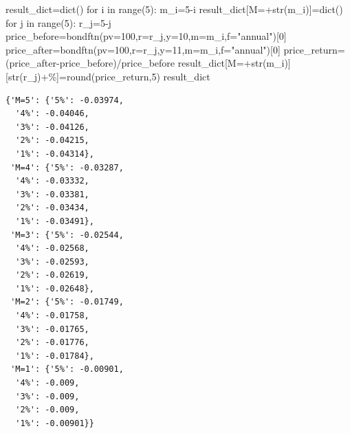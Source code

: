 \documentclass[
  a4paper,
  DIV=11,
  numbers=noendperiod]{scrreprt}
\newenvironment{Shaded}{\begin{snugshade}}{\end{snugshade}}
\newcommand{\BuiltInTok}[1]{\textcolor[rgb]{0.00,0.23,0.31}{#1}}
\newcommand{\ControlFlowTok}[1]{\textcolor[rgb]{0.00,0.23,0.31}{#1}}
\newcommand{\DecValTok}[1]{\textcolor[rgb]{0.68,0.00,0.00}{#1}}
\newcommand{\KeywordTok}[1]{\textcolor[rgb]{0.00,0.23,0.31}{#1}}
\newcommand{\NormalTok}[1]{\textcolor[rgb]{0.00,0.23,0.31}{#1}}
\newcommand{\OperatorTok}[1]{\textcolor[rgb]{0.37,0.37,0.37}{#1}}
\newcommand{\StringTok}[1]{\textcolor[rgb]{0.13,0.47,0.30}{#1}}
\begin{document}
\begin{Shaded}
\begin{Highlighting}[]
\NormalTok{result\_dict}\OperatorTok{=}\BuiltInTok{dict}\NormalTok{()}
\ControlFlowTok{for}\NormalTok{ i }\KeywordTok{in} \BuiltInTok{range}\NormalTok{(}\DecValTok{5}\NormalTok{):}
\NormalTok{    m\_i}\OperatorTok{=}\DecValTok{5}\OperatorTok{{-}}\NormalTok{i}
\NormalTok{    result\_dict[}\StringTok{\textquotesingle{}M=\textquotesingle{}}\OperatorTok{+}\BuiltInTok{str}\NormalTok{(m\_i)]}\OperatorTok{=}\BuiltInTok{dict}\NormalTok{()}
    \ControlFlowTok{for}\NormalTok{ j }\KeywordTok{in} \BuiltInTok{range}\NormalTok{(}\DecValTok{5}\NormalTok{):}
\NormalTok{        r\_j}\OperatorTok{=}\DecValTok{5}\OperatorTok{{-}}\NormalTok{j}
\NormalTok{        price\_before}\OperatorTok{=}\NormalTok{bondftn(pv}\OperatorTok{=}\DecValTok{100}\NormalTok{,r}\OperatorTok{=}\NormalTok{r\_j,y}\OperatorTok{=}\DecValTok{10}\NormalTok{,m}\OperatorTok{=}\NormalTok{m\_i,f}\OperatorTok{=}\StringTok{"annual"}\NormalTok{)[}\DecValTok{0}\NormalTok{]}
\NormalTok{        price\_after}\OperatorTok{=}\NormalTok{bondftn(pv}\OperatorTok{=}\DecValTok{100}\NormalTok{,r}\OperatorTok{=}\NormalTok{r\_j,y}\OperatorTok{=}\DecValTok{11}\NormalTok{,m}\OperatorTok{=}\NormalTok{m\_i,f}\OperatorTok{=}\StringTok{"annual"}\NormalTok{)[}\DecValTok{0}\NormalTok{]}
\NormalTok{        price\_return}\OperatorTok{=}\NormalTok{(price\_after}\OperatorTok{{-}}\NormalTok{price\_before)}\OperatorTok{/}\NormalTok{price\_before}
\NormalTok{        result\_dict[}\StringTok{\textquotesingle{}M=\textquotesingle{}}\OperatorTok{+}\BuiltInTok{str}\NormalTok{(m\_i)][}\BuiltInTok{str}\NormalTok{(r\_j)}\OperatorTok{+}\StringTok{\textquotesingle{}\%\textquotesingle{}}\NormalTok{]}\OperatorTok{=}\BuiltInTok{round}\NormalTok{(price\_return,}\DecValTok{5}\NormalTok{)}
\NormalTok{result\_dict}
\end{Highlighting}
\end{Shaded}

\begin{verbatim}
{'M=5': {'5%': -0.03974,
  '4%': -0.04046,
  '3%': -0.04126,
  '2%': -0.04215,
  '1%': -0.04314},
 'M=4': {'5%': -0.03287,
  '4%': -0.03332,
  '3%': -0.03381,
  '2%': -0.03434,
  '1%': -0.03491},
 'M=3': {'5%': -0.02544,
  '4%': -0.02568,
  '3%': -0.02593,
  '2%': -0.02619,
  '1%': -0.02648},
 'M=2': {'5%': -0.01749,
  '4%': -0.01758,
  '3%': -0.01765,
  '2%': -0.01776,
  '1%': -0.01784},
 'M=1': {'5%': -0.00901,
  '4%': -0.009,
  '3%': -0.009,
  '2%': -0.009,
  '1%': -0.00901}}
\end{verbatim}
\end{document}
